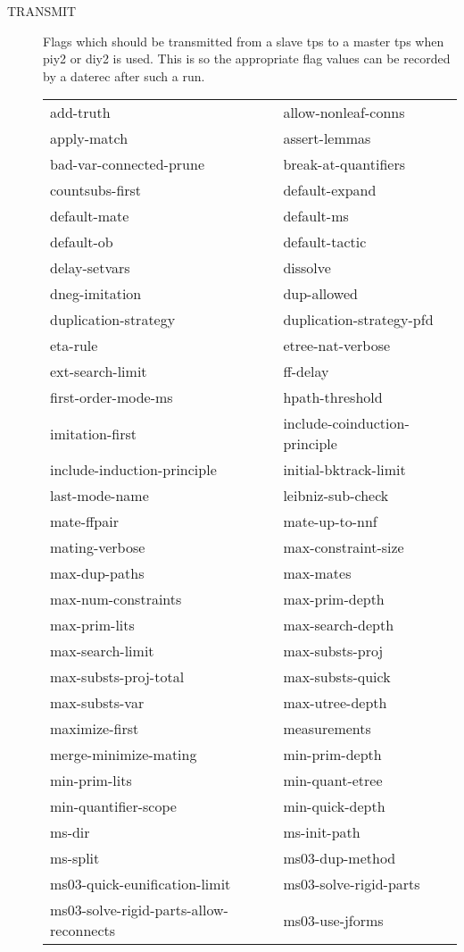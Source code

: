 \begin{description}
\item[TRANSMIT]  
Flags which should be transmitted from a slave tps to a master tps
when piy2 or diy2 is used.  This is so the appropriate flag values can
be recorded by a daterec after such a run.

\begin{tabular}{l l}
add-truth&allow-nonleaf-conns\\
apply-match&assert-lemmas\\
bad-var-connected-prune&break-at-quantifiers\\
countsubs-first&default-expand\\
default-mate&default-ms\\
default-ob&default-tactic\\
delay-setvars&dissolve\\
dneg-imitation&dup-allowed\\
duplication-strategy&duplication-strategy-pfd\\
eta-rule&etree-nat-verbose\\
ext-search-limit&ff-delay\\
first-order-mode-ms&hpath-threshold\\
imitation-first&include-coinduction-principle\\
include-induction-principle&initial-bktrack-limit\\
last-mode-name&leibniz-sub-check\\
mate-ffpair&mate-up-to-nnf\\
mating-verbose&max-constraint-size\\
max-dup-paths&max-mates\\
max-num-constraints&max-prim-depth\\
max-prim-lits&max-search-depth\\
max-search-limit&max-substs-proj\\
max-substs-proj-total&max-substs-quick\\
max-substs-var&max-utree-depth\\
maximize-first&measurements\\
merge-minimize-mating&min-prim-depth\\
min-prim-lits&min-quant-etree\\
min-quantifier-scope&min-quick-depth\\
ms-dir&ms-init-path\\
ms-split&ms03-dup-method\\
ms03-quick-eunification-limit&ms03-solve-rigid-parts\\
ms03-solve-rigid-parts-allow-reconnects&ms03-use-jforms\\

\end{tabular}
\end{description}

